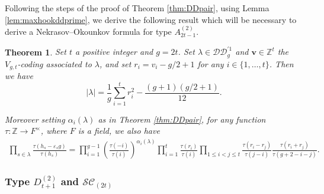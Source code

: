 \documentclass[11pt,letterpaper]{amsart}
\def\bbbz{\mathbb Z}
\def\cch{\mathcal H}
\def\ccsc{\mathcal {SC}}
\def\ccdd{\mathcal {DD}}
\newtheorem{thm}[df]{Theorem}
\numberwithin{equation}{section}
\numberwithin{df}{section}
\begin{document}
Following the steps of the proof of Theorem \ref{thm:DDpair}, using Lemma \ref{lem:maxhookddprime}, we derive the following result which will be necessary to derive a Nekrasov--Okounkov formula for type $A^{(2)}_{2t-1}$.
\begin{thm}\label{thm:DDtquotpair}
Set $t$ a positive integer and $g=2t$. Set $\lambda\in \ccdd_{g}^{'1}$ and $\mathbf{v}\in\bbbz^{t}$ the $V_{g,t}$-coding associated to $\lambda$, and set $r_i=v_i-g/2+1$ for any $i\in\lbrace1,\dots,t\rbrace$. Then we have
$$\lvert \lambda\rvert = \frac{1}{g}\sum_{i=1}^{t} r_i^2-\frac{(g+1)(g/2 +1)}{12}.$$

Moreover setting $\alpha_i(\lambda)$ as in Theorem \ref{thm:DDpair}, for any function $\tau:\bbbz\rightarrow F^{\times}$, where $F$ is a field, we also have
\begin{multline}\label{eq:thmddprimepairtquot}
\prod_{s\in\lambda}\frac{\tau(h_s-\varepsilon_s g)}{\tau(h_s)}=\prod_{i=1}^{g-1}\left(\frac{\tau(-i)}{\tau(i)}\right)^{\alpha_i(\lambda)}
\prod_{i=1}^{t}\frac{\tau(r_i)}{\tau(i)}\prod_{1\leq i<j\leq t} \frac{\tau(r_i-r_j)}{\tau(j-i)} \frac{\tau(r_i+r_j)}{\tau(g+2-i-j)}.
\end{multline}


\end{thm}


\subsubsection{Type $D^{(2)}_{t+1}$ and $\ccsc_{(2t)}$}
\end{document}
